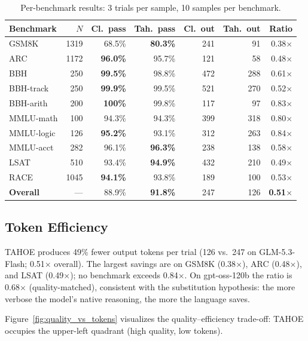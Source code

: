 \documentclass[11pt,a4paper]{article}
\begin{document}
\begin{table}[t]
\centering
\caption{Per-benchmark results: 3 trials per sample, 10 samples per benchmark.}
\label{tab:results}
\small
\begin{tabular}{lrrrrrr}
\toprule
Benchmark & $N$ & Cl.\ pass & Tah.\ pass & Cl.\ out & Tah.\ out & Ratio \\
\midrule
GSM8K & 1319 & 68.5\% & \textbf{80.3\%} & 241 & 91 & 0.38$\times$ \\
ARC & 1172 & \textbf{96.0\%} & 95.7\% & 121 & 58 & 0.48$\times$ \\
BBH & 250 & \textbf{99.5\%} & 98.8\% & 472 & 288 & 0.61$\times$ \\
BBH-track & 250 & \textbf{99.9\%} & 99.5\% & 521 & 270 & 0.52$\times$ \\
BBH-arith & 200 & \textbf{100\%} & 99.8\% & 117 & 97 & 0.83$\times$ \\
MMLU-math & 100 & 94.3\% & 94.3\% & 399 & 318 & 0.80$\times$ \\
MMLU-logic & 126 & \textbf{95.2\%} & 93.1\% & 312 & 263 & 0.84$\times$ \\
MMLU-acct & 282 & 96.1\% & \textbf{96.3\%} & 238 & 138 & 0.58$\times$ \\
LSAT & 510 & 93.4\% & \textbf{94.9\%} & 432 & 210 & 0.49$\times$ \\
RACE & 1045 & \textbf{94.1\%} & 93.8\% & 189 & 100 & 0.53$\times$ \\
\midrule
\textbf{Overall} & --- & 88.9\% & \textbf{91.8\%} & 247 & 126 & \textbf{0.51$\times$} \\
\bottomrule
\end{tabular}
\end{table}

\subsection{Token Efficiency}

TAHOE produces 49\% fewer output tokens per trial (126 vs.\ 247 on GLM-5.3-Flash; 0.51$\times$ overall).
The largest savings are on GSM8K (0.38$\times$), ARC (0.48$\times$), and LSAT (0.49$\times$); no benchmark exceeds 0.84$\times$. On gpt-oss-120b the ratio is 0.68$\times$ (quality-matched), consistent with the substitution hypothesis: the more verbose the model's native reasoning, the more the language saves.

Figure~\ref{fig:quality_vs_tokens} visualizes the quality--efficiency trade-off: TAHOE occupies the upper-left quadrant (high quality, low tokens).
\end{document}
